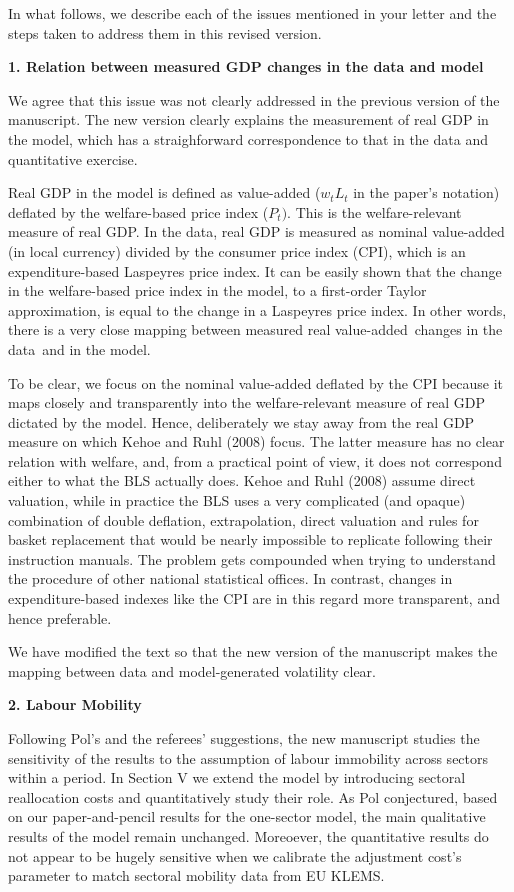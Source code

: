 \documentclass[12pt]{article}
\begin{document}
In what follows, we describe each of the issues mentioned in your letter and
the steps taken to address them in this revised version.\bigskip

\textbf{1. Relation between measured GDP changes in the data and model}

We agree that this issue was not clearly addressed in the previous version
of the manuscript. The new version clearly explains the measurement of real
GDP in the model, which has a straighforward correspondence to that in the
data and quantitative exercise.

Real GDP in the model is defined as value-added ($w_{t}L_{t}$ in the paper's
notation) deflated by the welfare-based price index ($P_{t})$. This is the
welfare-relevant measure of real GDP. In the data, real GDP is measured as
nominal value-added (in local currency) divided by the consumer price index
(CPI), which is an expenditure-based Laspeyres price index. It can be easily
shown that the change in the welfare-based price index in the model, to a
first-order Taylor approximation, is equal to the change in a Laspeyres
price index. In other words, there is a very close mapping between measured
real value-added\ changes in the data\ and in the model.

To be clear, we focus on the nominal value-added deflated by the CPI because
it maps closely and transparently into the welfare-relevant measure of real
GDP dictated by the model. Hence, deliberately we stay away from the real
GDP measure on which Kehoe and Ruhl (2008) focus. The latter measure has no
clear relation with welfare, and, from a practical point of view, it does
not correspond either to what the BLS actually does. Kehoe and Ruhl (2008)
assume direct valuation, while in practice the BLS uses a very complicated
(and opaque) combination of double deflation, extrapolation, direct
valuation and rules for basket replacement that would be nearly impossible
to replicate following their instruction manuals. The problem gets
compounded when trying to understand the procedure of other national
statistical offices. In contrast, changes in expenditure-based indexes like
the CPI are in this regard more transparent, and hence preferable.

We have modified the text so that the new version of the manuscript makes
the mapping between data and model-generated volatility clear.\bigskip

\textbf{2. Labour Mobility}

Following Pol's and the referees' suggestions, the new manuscript studies
the sensitivity of the results to the assumption of labour immobility across
sectors within a period. In Section V we extend the model by introducing
sectoral reallocation costs and quantitatively study their role. As Pol
conjectured, based on our paper-and-pencil results for the one-sector model,
the main qualitative results of the model remain unchanged. Moreoever, the
quantitative results do not appear to be hugely sensitive when we calibrate
the adjustment cost's parameter to match sectoral mobility data from EU
KLEMS.
\end{document}
